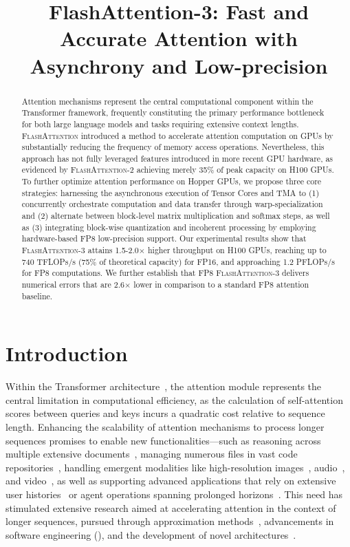\title{FlashAttention-3: Fast and Accurate Attention with Asynchrony and Low-precision}

\begin{abstract}
Attention mechanisms represent the central computational component within the Transformer framework, frequently constituting the primary performance bottleneck for both large language models and tasks requiring extensive context lengths. \textsc{FlashAttention} introduced a method to accelerate attention computation on GPUs by substantially reducing the frequency of memory access operations. Nevertheless, this approach has not fully leveraged features introduced in more recent GPU hardware, as evidenced by \textsc{FlashAttention-2} achieving merely 35\% of peak capacity on H100 GPUs. To further optimize attention performance on Hopper GPUs, we propose three core strategies: harnessing the asynchronous execution of Tensor Cores and TMA to (1) concurrently orchestrate computation and data transfer through warp-specialization and (2) alternate between block-level matrix multiplication and softmax steps, as well as (3) integrating block-wise quantization and incoherent processing by employing hardware-based FP8 low-precision support. Our experimental results show that \textsc{FlashAttention-3} attains 1.5-2.0$\times$ higher throughput on H100 GPUs, reaching up to 740 TFLOPs/s (75\% of theoretical capacity) for FP16, and approaching 1.2 PFLOPs/s for FP8 computations. We further establish that FP8 \textsc{FlashAttention-3} delivers numerical errors that are 2.6$\times$ lower in comparison to a standard FP8 attention baseline.
\end{abstract}

\section{Introduction}
\label{sec:intro}

Within the Transformer architecture~\citep{vaswani2017attention}, the attention module represents the central limitation in computational efficiency, as the calculation of self-attention scores between queries and keys incurs a quadratic cost relative to sequence length. Enhancing the scalability of attention mechanisms to process longer sequences promises to enable new functionalities—such as reasoning across multiple extensive documents~\citep{guo2021longt5,shaham2022scrolls,peng2023yarn}, managing numerous files in vast code repositories~\citep{roziere2023code, li2023starcoder}, handling emergent modalities like high-resolution images~\citep{chen2022scaling}, audio~\citep{gulati2020conformer}, and video~\citep{ho2022video}, as well as supporting advanced applications that rely on extensive user histories~\citep{sun2019bert4rec} or agent operations spanning prolonged horizons~\citep{yao2022react}. This need has stimulated extensive research aimed at accelerating attention in the context of longer sequences, pursued through approximation methods~\citep{katharopoulos2020transformers,choromanski2020rethinking, tay2020efficient}, advancements in software engineering (\citep{rabe2021self,dao2022flashattention,kwon2023efficient}), and the development of novel architectures~\citep{peng2023rwkv,sun2023retentive,gu2023mamba}.


